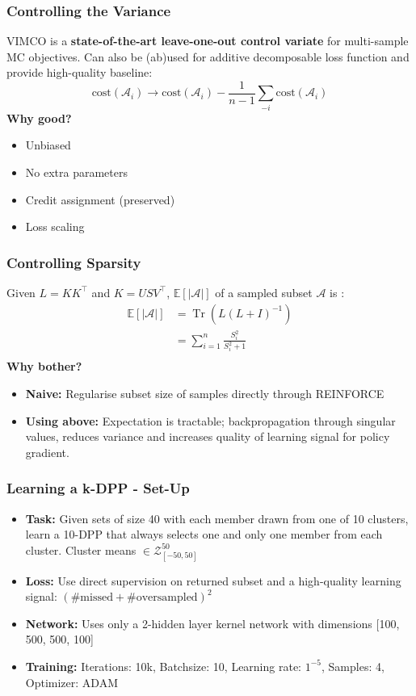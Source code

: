 \documentclass[aspectratio=43]{beamer}
\DeclareMathOperator{\Tr}{Tr}
\begin{document}
\begin{frame}
\frametitle{Controlling the Variance}
\newline
VIMCO \cite{DBLP:journals/corr/MnihR16} is a \textbf{state-of-the-art leave-one-out control variate} for multi-sample MC objectives. Can also be (ab)used for additive decomposable loss function and provide high-quality baseline: 
\begin{equation}
\textrm{cost}(\mathcal{A}_{i}) \rightarrow \textrm{cost}(\mathcal{A}_{i}) - \frac{1}{n-1}\sum_{-i}\textrm{cost}(\mathcal{A}_{i})
\end{equation}
\newline
\textbf{Why good?}
\begin{itemize}
\item Unbiased
\item No extra parameters
\item Credit assignment (preserved)
\item Loss scaling
\end{itemize}
\end{frame}

\begin{frame}
\frametitle{Controlling Sparsity}
\newline
Given $L = KK^\top$ and $K = USV^\top$, $\mathbb{E}[\left\vert{\mathcal{A}}\right\vert]$ of a sampled subset $\mathcal{A}$ is \cite{kulesza2012learning}: 
\begin{align*}
\mathbb{E}[\left\vert{\mathcal{A}}\right\vert] &= \Tr(L(L+I)^{-1})  \\
&= \sum_{i=1}^{n}\frac{S_{i}^{2}}{S_{i}^{2} + 1} \\
\end{align*}
\textbf{Why bother?} 
\begin{itemize}
\item{\textbf{Naive:} Regularise subset size of samples directly through REINFORCE}
\item{\textbf{Using above:} Expectation is tractable; backpropagation through singular values, reduces variance and increases quality of learning signal for policy gradient.}
\end{itemize}
\clearpage
\end{frame}

\begin{frame}
\frametitle{Learning a k-DPP - Set-Up}
\begin{itemize}
\item{\textbf{Task:} Given sets of size 40 with each member drawn from one of 10 clusters, learn a 10-DPP that always selects one and only one member from each cluster. Cluster means $\in \mathcal{Z}^{50}_{[-50, 50]}$} 
\item{\textbf{Loss:} Use direct supervision on returned subset and a high-quality learning signal: $(\textrm{\#missed} + \textrm{\#oversampled})^{2}$}
\item{\textbf{Network:} Uses only a 2-hidden layer kernel network with dimensions [100, 500, 500, 100]}
\item{\textbf{Training:} Iterations: 10k, Batchsize: 10, Learning rate: $1^{-5}$}, Samples: 4, Optimizer: ADAM
\end{itemize}
\end{frame}
\end{document}
